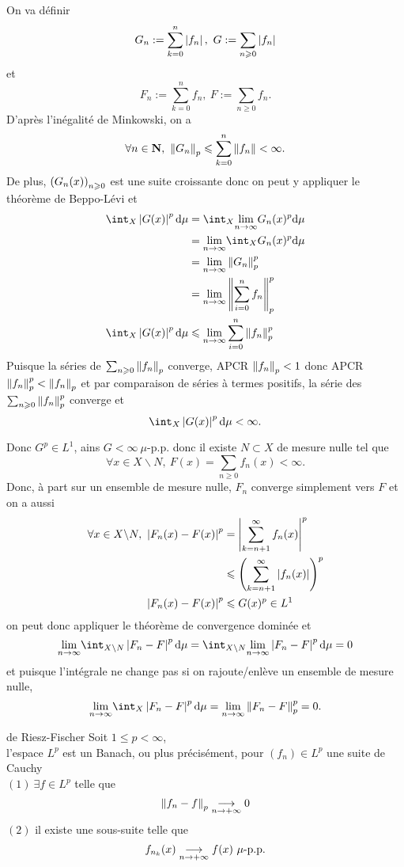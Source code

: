 \documentclass[a4paper,11pt, twoside]{article}
\begin{document}
\begin{Proof}
  On va définir
  $$G_n:=\sum_{k=0}^n\left| f_n\right|,\ G:=\sum_{n\geqslant 0}\left| f_n\right|$$
  et
  $$F_n:=\sum_{k=0}^nf_n,\ F:=\sum_{n\geqslant 0}f_n.$$
  D'après l'inégalité de Minkowski, on a 
  $$\forall n\in\mathbf N,\ \left\lVert G_n\right\rVert_p\leqslant \sum_{k=0}^n\left\lVert f_n\right\rVert<\infty.$$
  De plus, $\left(G_n(x)\right)_{n\geqslant 0}$ est une suite croissante donc on peut y appliquer le théorème de Beppo-Lévi et 
  \begin{align*}
    \int_X \abs{G(x)}^p\mathrm d\mu&=\int_X\underset{n\to\infty}{\mathrm{lim}}G_n(x)^p\mathrm d\mu\\
    &=\underset{n\to\infty}{\mathrm{lim}}\int_XG_n(x)^p\mathrm d\mu\\
    &=\underset{n\to\infty}{\mathrm{lim}}\norm{G_n}_p^p\\
    &=\underset{n\to\infty}{\mathrm{lim}}\norm{\sum_{i=0}^n f_n}_p^p\\
    \int_X \abs{G(x)}^p\mathrm d\mu&\leqslant\underset{n\to\infty}{\mathrm{lim}}\sum_{i=0}^n\norm{ f_n}_p^p
  \end{align*}
  Puisque la séries de $\sum_{n\geqslant 0}\left\lVert f_n\right\rVert_p$ converge, APCR $\left\lVert f_n\right\rVert_p<1$ donc APCR $\left\lVert f_n\right\rVert_p^p<\left\lVert f_n\right\rVert_p$ et par comparaison de séries à termes positifs, la série des $\sum_{n\geqslant 0}\left\lVert f_n\right\rVert_p^p$ converge et 
  $$\int_X \abs{G(x)}^p\mathrm d\mu<\infty.$$

  Donc $G^p\in L^1$, ains $G<\infty\ \mu$-p.p. donc il existe $N\subset X$ de mesure nulle tel que 
  $$\forall x\in X\backslash N,\ F(x)=\sum_{n\geqslant 0}f_n(x)<\infty.$$
  Donc, à part sur un ensemble de mesure nulle, $F_n$ converge simplement vers $F$ et on a aussi 
  \begin{align*}
    \forall x\in X\backslash N,\ \abs{F_n(x)-F(x)}^p&=\abs{\sum_{k=n+1}^\infty f_n(x)}^p\\
    &\leqslant \Par{\sum_{k=n+1}^\infty \abs{f_n(x)}}^p\\
    \abs{F_n(x)-F(x)}^p&\leqslant G(x)^p\in L^1
  \end{align*}
  on peut donc appliquer le théorème de convergence dominée et 
  $$\Lim \int_{X\backslash N}\abs{F_n-F }^p\mathrm d\mu=\int_{X\backslash N}\Lim\abs{F_n-F }^p\mathrm d\mu=0$$
  et puisque l'intégrale ne change pas si on rajoute/enlève un ensemble de mesure nulle, 
  $$\Lim \int_X\abs{F_n-F }^p\mathrm d\mu=\Lim\norm{F_n-F}_p^p=0.$$
\end{Proof}


\begin{thC}{de Riesz-Fischer}
  Soit $1\leqslant p< \infty$,\\

  l'espace $L^p$ est un Banach, ou plus précisément, pour $(f_n)\in L^p$ une suite de Cauchy\\
  $(\mathit 1)\ \exists f\in L^p$ telle que 
  $$\left\lVert f_n-f\right\rVert_p\underset{n\to+\infty}{\longrightarrow} 0$$
  $(\mathit 2)$ il existe une sous-suite telle que 
  $$f_{n_k}(x)\tend f(x)\ \mu\text{-p.p.}$$
\end{thC}
\end{document}
